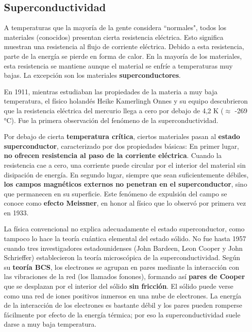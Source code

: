 \subsection{Superconductividad}


A temperaturas que la mayoría de la gente considera ``normales", todos los materiales (conocidos) presentan cierta resistencia eléctrica. Esto significa muestran una resistencia al flujo de corriente eléctrica. Debido a esta resistencia, parte de la energía se pierde en forma de calor. En la mayoría de los materiales, esta resistencia se mantiene aunque el material se enfríe a temperaturas muy bajas. La excepción son los materiales \textbf{superconductores}.

En 1911, mientras estudiaban las propiedades de la materia a muy baja temperatura, el físico holandés Heike Kamerlingh Onnes y su equipo descubrieron que la resistencia eléctrica del mercurio llega a cero por debajo de 4,2 K ($\approx$ -269 °C).  Fue la primera observación del fenómeno de la superconductividad.  

Por debajo de cierta \textbf{temperatura crítica}, ciertos materiales pasan al \textbf{estado superconductor}, caracterizado por dos propiedades básicas: En primer lugar, \textbf{no ofrecen resistencia al paso de la corriente eléctrica}. Cuando la resistencia cae a cero, una corriente puede circular por el interior del material sin disipación de energía. En segundo lugar, siempre que sean suficientemente débiles, \textbf{los campos magnéticos externos no penetran en el superconductor}, sino que permanecen en su superficie. Este fenómeno de expulsión del campo se conoce como \textbf{efecto Meissner}, en honor al físico que lo observó por primera vez en 1933.

La física convencional no explica adecuadamente el estado superconductor, como tampoco lo hace la teoría cuántica elemental del estado sólido. No fue hasta 1957 cuando tres investigadores estadounidenses (John Bardeen, Leon Cooper y John Schrieffer) establecieron la teoría microscópica de la superconductividad. Según su \textbf{teoría BCS}, los electrones se agrupan en pares mediante la interacción con las vibraciones de la red (los llamados fonones), formando así \textbf{pares de Cooper} que se desplazan por el interior del sólido \textbf{sin fricción}. El sólido puede verse como una red de iones positivos inmersos en una nube de electrones. La energía de la interacción de los electrones es bastante débil y los pares pueden romperse fácilmente por efecto de la energía térmica; por eso la superconductividad suele darse a muy baja temperatura.

